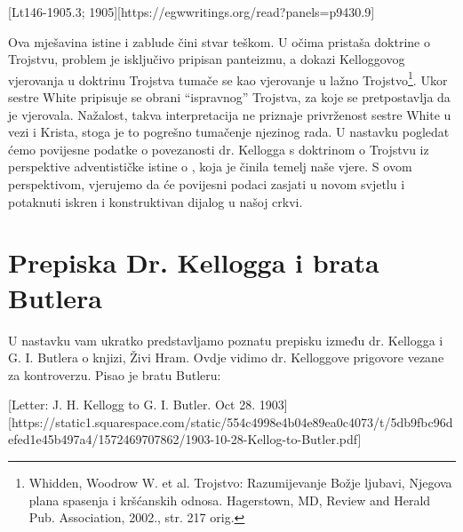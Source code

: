 [Lt146-1905.3; 1905][https://egwwritings.org/read?panels=p9430.9]

Ova mješavina istine i zablude čini stvar teškom. U očima pristaša doktrine o Trojstvu, problem je isključivo pripisan panteizmu, a dokazi Kelloggovog vjerovanja u doktrinu Trojstva tumače se kao vjerovanje u lažno Trojstvo\footnote{Whidden, Woodrow W. et al. Trojstvo: Razumijevanje Božje ljubavi, Njegova plana spasenja i kršćanskih odnosa. Hagerstown, MD, Review and Herald Pub. Association, 2002., str. 217 orig.}. Ukor sestre White pripisuje se obrani “ispravnog” Trojstva, za koje se pretpostavlja da je vjerovala. Nažalost, takva interpretacija ne priznaje privrženost sestre White  u vezi  i Krista, stoga je to pogrešno tumačenje njezinog rada. U nastavku pogledat ćemo povijesne podatke o povezanosti dr. Kellogga s doktrinom o Trojstvu iz perspektive adventističke istine o , koja je činila temelj naše vjere. S ovom perspektivom, vjerujemo da će povijesni podaci zasjati u novom svjetlu i potaknuti iskren i konstruktivan dijalog u našoj crkvi.

\section*{Prepiska Dr. Kellogga i brata Butlera}

U nastavku vam ukratko predstavljamo poznatu prepisku između dr. Kellogga i G. I. Butlera o knjizi, Živi Hram. Ovdje vidimo dr. Kelloggove prigovore vezane za kontroverzu. Pisao je bratu Butleru:

[Letter: J. H. Kellogg to G. I. Butler. Oct 28. 1903][https://static1.squarespace.com/static/554c4998e4b04e89ea0c4073/t/5db9fbc96defed1e45b497a4/1572469707862/1903-10-28-Kellog-to-Butler.pdf]

